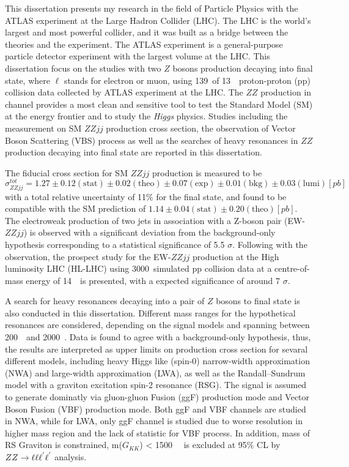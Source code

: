 \begin{enabstract}
This dissertation presents my research in the field of Particle Physics with the ATLAS experiment at the Large Hadron Collider (LHC). 
The LHC is the world's largest and most powerful collider, and it was built as a bridge between the theories and the experiment.
The ATLAS experiment is a general-purpose particle detector experiment with the largest volume at the LHC.
This dissertation focus on the studies with two $Z$ bosons production decaying into \llll final state, where $\mathrm{\ell}$ stands for electron or muon, using 139~\ifb of 13~\tev~proton-proton (pp) collision data collected by ATLAS experiment at the LHC.
The $ZZ$ production in \llll channel provides a most clean and sensitive tool to test the Standard Model (SM) at the energy frontier and to study the \textit{Higgs} physics.
Studies including the measurement on SM $ZZjj$ production cross section, the observation of Vector Boson Scattering (VBS) process as well as the searches of heavy resonances in $ZZ$ production decaying into \llll final state
are reported in this dissertation.

The fiducial cross section for SM $ZZjj$ production is measured to be 
    $\sigma_{ZZjj}^{tot} = 1.27 \pm 0.12 (\mathrm{stat}) \pm 0.02 (\mathrm{theo}) \pm 0.07 (\mathrm{exp}) \pm 0.01 (\mathrm{bkg}) \pm 0.03 (\mathrm{lumi}) [pb]$
    with a total relative uncertainty of 11\% for the \llll final state, and found to be compatible with the SM prediction of $1.14 \pm 0.04 (\mathrm{stat}) \pm 0.20 (\mathrm{theo}) [pb]$.
The electroweak production of two jets in association with a Z-boson pair (EW-$ZZjj$) is observed with
a significant deviation from the background-only hypothesis corresponding to a statistical significance of 5.5 $\sigma$.
Following with the observation, the prospect study for the EW-$ZZjj$ production at the High luminosity LHC (HL-LHC) using 3000~\ifb simulated pp collision data at a centre-of-mass energy of 14~\tev~is presented,
with a expected significance of around 7 $\sigma$.

A search for heavy resonances decaying into a pair of $Z$ bosons to \llll final state is also conducted in this dissertation.
Different mass ranges for the hypothetical resonances are considered, depending on the signal models and spanning between 200~\gev~and 2000~\gev.
Data is found to agree with a background-only hypothesis, thus, the results are interpreted as upper limits on production cross section for sevaral different models, 
including heavy Higgs like (spin-0) narrow-width approximation (NWA) and large-width approximation (LWA), as well as the Randall–Sundrum model with a graviton excitation spin-2 resonance (RSG).
The signal is assumed to generate dominatly via gluon-gluon Fusion (ggF) production mode and Vector Boson Fusion (VBF) production mode.
Both ggF and VBF channels are studied in NWA, while for LWA, only ggF channel is studied due to worse resolution in higher mass region and the lack of statistic for VBF process.
In addition, mass of RS Graviton is constrained, m($G_{KK}$) < 1500~\gev~ is excluded at 95\% CL by $ZZ \rightarrow \ell\ell\ell^{'}\ell^{'}$ analysis.

\end{enabstract}
